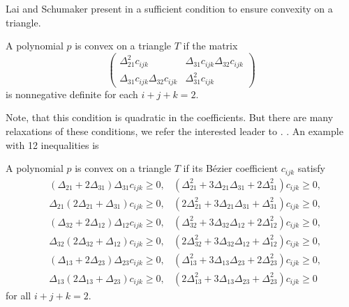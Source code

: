 Lai and Schumaker present in \cite{LS2007}  a sufficient condition to ensure convexity on a triangle.
\begin{theorem}
	A polynomial $p$ is convex on a triangle $T$ if the matrix
	\[
		\begin{pmatrix}
			\Delta_{21}^2 c_{ijk} & \Delta_{31} c_{ijk} \Delta_{32} c_{ijk}\\
			\Delta_{31}c_{ijk} \Delta_{32} c_{ijk} & \Delta_{31}^2 c_{ijk} 
		\end{pmatrix}
	\]
	is nonnegative definite for each $i + j + k =2 $.
\end{theorem}
Note, that this condition is quadratic in the coefficients. But there are many relaxations of these conditions, we refer the interested leader to \cite{SS2010}. . An example with 12 inequalities is 
\begin{theorem}
	A polynomial $p$ is convex on a triangle $T$ if its B\'ezier coefficient $c_{ijk}$ satisfy
	\begin{align*}
		&(\Delta_{21} + 2\Delta_{31}) \Delta_{31} c_{ijk} \geq 0, 
		&   (\Delta_{21}^2 + 3\Delta_{21} \Delta_{31} + 2 \Delta_{31}^2) c_{ijk} \geq 0, \\
		& \Delta_{21}(2\Delta_{21} + \Delta_{31})  c_{ijk} \geq 0, 
		&   (2\Delta_{21}^2 + 3\Delta_{21} \Delta_{31} +  \Delta_{31}^2) c_{ijk} \geq 0, \\  
		&(\Delta_{32} + 2\Delta_{12}) \Delta_{12} c_{ijk} \geq 0, 
		&   (\Delta_{32}^2 + 3\Delta_{32} \Delta_{12} + 2 \Delta_{12}^2) c_{ijk} \geq 0, \\
		&\Delta_{32} (2\Delta_{32} + \Delta_{12}) c_{ijk} \geq 0, 
		&   (2\Delta_{32}^2 + 3\Delta_{32} \Delta_{12} +  \Delta_{12}^2) c_{ijk} \geq 0, \\  
		&(\Delta_{13} + 2\Delta_{23}) \Delta_{23} c_{ijk} \geq 0, 
		&   (\Delta_{13}^2 + 3\Delta_{13} \Delta_{23} + 2 \Delta_{23}^2) c_{ijk} \geq 0, \\
		& \Delta_{13}(2\Delta_{13} + \Delta_{23})  c_{ijk} \geq 0, 
		&   (2\Delta_{13}^2 + 3\Delta_{13} \Delta_{23} +  \Delta_{23}^2) c_{ijk} \geq 0   
	\end{align*}
	for all $i + j + k =2 $.
\end{theorem}

